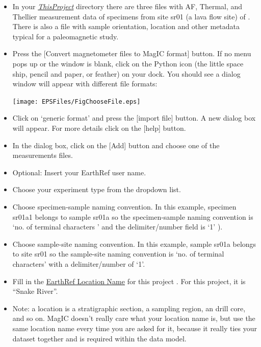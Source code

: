 \documentclass[11pt]{book}
\begin{document}
{{\begin{itemize}

\item In your  \href{#Project_Directory}{\it ThisProject} directory  there are three files with AF, Thermal, and Thellier measurement data of specimens from site sr01 (a lava flow site) of \cite{tauxe04b}.  There is also a file with sample orientation, location and other metadata typical for a paleomagnetic study.
\item Press the [Convert magnetometer files to MagIC format] button. If no menu pops up or the window is blank, click on the Python icon  (the little space ship, pencil and paper, or feather) on your dock. You should see a dialog window will appear with different file formats:

\texttt{[image: EPSFiles/FigChooseFile.eps]}

\item  Click on  `generic format'  and press the  [import file] button.  A new dialog box will appear. For more details click on the [help] button.
\item  In the dialog box, click on the [Add] button and choose one of the measurements files.
\item  Optional: Insert your EarthRef user name.
\item Choose your experiment type from the dropdown list.

\item Choose specimen-sample naming convention.  In this example, specimen sr01a1 belongs to sample sr01a so the specimen-sample naming convention is  `no. of terminal characters ' and the delimiter/number field is `1' ).
\item Choose sample-site naming convention.  In this example, sample sr01a belongs to site sr01 so the sample-site naming convention is  `no. of terminal characters' with a delimiter/number of  `1'.
\item  Fill in the \href{#MagICDatabase}{EarthRef Location Name}  for this project .  For this project, it is ``Snake River''.

\item Note:  a location is a stratigraphic section,  a sampling region,  an drill core, and so on.  MagIC doesn't really care what your location name is, but use the same location name every time you are asked for it, because it really ties your dataset together and is required within the data model.


\end{itemize}}}
\end{document}
